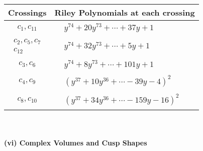 \documentclass[1p]{elsarticle_modified}
\theoremstyle{definition}
\begin{document}
\begin{tabular}{m{50pt}|m{274pt}}
Crossings & \hspace{64pt}Riley Polynomials at each crossing \\
\hline $$\begin{aligned}c_{1},c_{11}\end{aligned}$$&$\begin{aligned}
&y^{74}+20 y^{73}+\cdots+37 y+1
\end{aligned}$\\
\hline $$\begin{aligned}c_{2},c_{5},c_{7}\\c_{12}\end{aligned}$$&$\begin{aligned}
&y^{74}+32 y^{73}+\cdots+5 y+1
\end{aligned}$\\
\hline $$\begin{aligned}c_{3},c_{6}\end{aligned}$$&$\begin{aligned}
&y^{74}+8 y^{73}+\cdots+101 y+1
\end{aligned}$\\
\hline $$\begin{aligned}c_{4},c_{9}\end{aligned}$$&$\begin{aligned}
&(y^{37}+10 y^{36}+\cdots-39 y-4)^{2}
\end{aligned}$\\
\hline $$\begin{aligned}c_{8},c_{10}\end{aligned}$$&$\begin{aligned}
&(y^{37}+34 y^{36}+\cdots-159 y-16)^{2}
\end{aligned}$\\
\hline
\end{tabular}\\~\\
\newpage\flushleft \textbf{(vi) Complex Volumes and Cusp Shapes}
\end{document}
